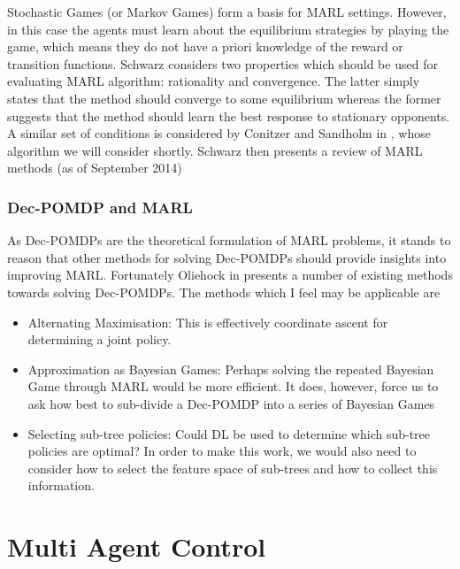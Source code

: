 \documentclass[preprint,8pt]{report}
\begin{document}
Stochastic Games (or Markov Games) form a basis for MARL settings. However, in this case the agents must learn about the equilibrium strategies by playing the game, which means they do not have a priori knowledge of the reward or transition functions. Schwarz considers two properties which should be used for evaluating MARL algorithm: rationality and convergence. The latter simply states that the method should converge to some equilibrium whereas the former suggests that the method should learn the best response to stationary opponents. A similar set of conditions is considered by Conitzer and Sandholm in \cite{ConitzerAWESOME:}, whose algorithm we will consider shortly. Schwarz then presents a review of MARL methods (as of September 2014) 

\subsection*{Dec-POMDP and MARL}

As Dec-POMDPs are the theoretical formulation of MARL problems, it stands to reason that other methods for solving Dec-POMDPs should provide insights into improving MARL. Fortunately Oliehock in \cite{OliehoekDecentralizedPOMDPs} presents a number of existing methods towards solving Dec-POMDPs. The methods which I feel may be applicable are 
\begin{itemize}
    \item Alternating Maximisation: This is effectively coordinate ascent for determining a joint policy.
    \item Approximation as Bayesian Games: Perhaps solving the repeated Bayesian Game through MARL would be more efficient. It does, however, force us to ask how best to sub-divide a Dec-POMDP into a series of Bayesian Games 
    \item Selecting sub-tree policies: Could DL be used to determine which sub-tree policies are optimal? In order to make this work, we would also need to consider how to select the feature space of sub-trees and how to collect this information.
\end{itemize}

\chapter{Multi Agent Control}
\end{document}
